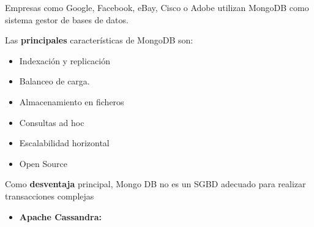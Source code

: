 \documentclass[12pt]{article}
\begin{document}
\begin{multicols}{2}
{\fontsize{9pt}{10.8pt}\selectfont Empresas como Google, Facebook, eBay, Cisco o Adobe utilizan MongoDB como sistema gestor de bases de datos.\par}\par

{\fontsize{9pt}{10.8pt}\selectfont Las \textbf{principales }características de MongoDB son:\par}\par

\begin{itemize}
	\item {\fontsize{9pt}{10.8pt}\selectfont Indexación y replicación\par}\par

	\item {\fontsize{9pt}{10.8pt}\selectfont Balanceo de carga.\par}\par

	\item {\fontsize{9pt}{10.8pt}\selectfont Almacenamiento en ficheros\par}\par

	\item {\fontsize{9pt}{10.8pt}\selectfont Consultas ad hoc\par}\par

	\item {\fontsize{9pt}{10.8pt}\selectfont Escalabilidad horizontal\par}\par

	\item {\fontsize{9pt}{10.8pt}\selectfont Open Source\par}
\end{itemize}\par

{\fontsize{9pt}{10.8pt}\selectfont Como \textbf{desventaja }principal, Mongo DB no es un SGBD adecuado para realizar transacciones complejas\par}\par


\vspace{\baselineskip}
\begin{itemize}
	\item {\fontsize{9pt}{10.8pt}\selectfont \textbf{Apache Cassandra:}\par}
\end{itemize}\par


\end{multicols}
\end{document}
